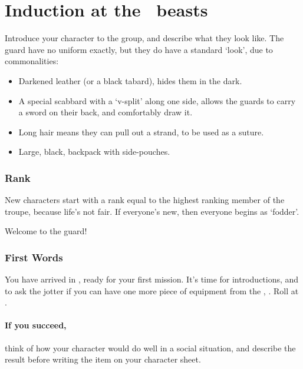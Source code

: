 \section[Induction at the \Glsfmttext{templeOfBeasts}]{Induction at the ~\gls{beasts}}
\label{ngIntroductions}

\begin{multicols}{2}

\noindent
Introduce your character to the group, and describe what they look like.
The \gls{guard} have no uniform exactly, but they do have a standard `look', due to commonalities:

\begin{itemize}
  \item
  Darkened leather (or a black tabard), hides them in the dark.
  \item
  A special scabbard with a `v-split' along one side, allows the \glspl{guard} to carry a sword on their back, and comfortably draw it.
  \item
  Long hair means they can pull out a strand, to be used as a suture.
  \item
  Large, black, backpack with side-pouches.
\end{itemize}

\subsubsection{Rank}
\label{ngRank}
New characters start with a rank equal to the highest ranking member of the troupe, because life's not fair.
If everyone's new, then everyone begins as `fodder'.

Welcome to the \gls{guard}!

\subsubsection{First Words}

You have arrived in , ready for your first mission.
It's time for introductions, and to ask the \gls{jotter} if you can have one more piece of equipment from the , .
Roll  at \tn[7].

\paragraph{If you succeed,}
think of how your character would do well in a social situation, and describe the result before writing the item on your character sheet.


\end{multicols}
